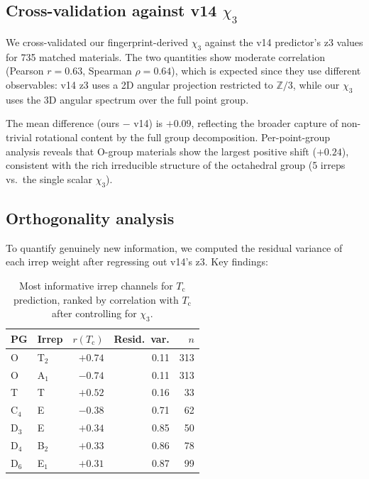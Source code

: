 \documentclass[aps,prb,twocolumn,superscriptaddress]{revtex4-2}
\newcommand{\ZZ}{\mathbb{Z}}
\newcommand{\Tc}{T_{\mathrm{c}}}
\begin{document}
\subsection{Cross-validation against v14 $\chi_3$}

We cross-validated our fingerprint-derived $\chi_3$ against the v14
predictor's z3 values for 735 matched materials. The two quantities
show moderate correlation (Pearson $r = 0.63$, Spearman $\rho = 0.64$),
which is expected since they use different observables: v14 z3 uses
a 2D angular projection restricted to $\ZZ/3$, while our $\chi_3$
uses the 3D angular spectrum over the full point group.

The mean difference (ours $-$ v14) is $+0.09$, reflecting the broader
capture of non-trivial rotational content by the full group
decomposition. Per-point-group analysis reveals that O-group materials
show the largest positive shift ($+0.24$), consistent with the rich
irreducible structure of the octahedral group (5 irreps vs.\ the
single scalar $\chi_3$).

\subsection{Orthogonality analysis}

To quantify genuinely new information, we computed the residual
variance of each irrep weight after regressing out v14's z3. Key
findings:

\begin{table}[h]
\caption{Most informative irrep channels for $\Tc$ prediction,
ranked by correlation with $\Tc$ after controlling for $\chi_3$.}
\label{tab:orthogonality}
\begin{ruledtabular}
\begin{tabular}{llrrr}
PG & Irrep & $r(\Tc)$ & Resid.\ var. & $n$ \\
\midrule
O  & T$_2$  & $+0.74$ & 0.11 & 313 \\
O  & A$_1$  & $-0.74$ & 0.11 & 313 \\
T  & T      & $+0.52$ & 0.16 & 33  \\
C$_4$ & E   & $-0.38$ & 0.71 & 62  \\
D$_3$ & E   & $+0.34$ & 0.85 & 50  \\
D$_4$ & B$_2$ & $+0.33$ & 0.86 & 78 \\
D$_6$ & E$_1$ & $+0.31$ & 0.87 & 99 \\
\end{tabular}
\end{ruledtabular}
\end{table}
\end{document}
